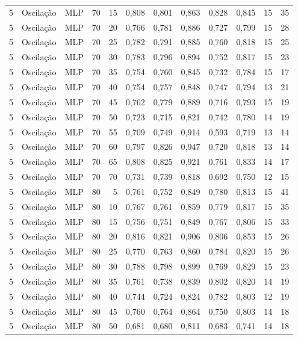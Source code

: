 \begin{longtable}{ccclrrrrrrrr}
5 & Oscilação & MLP & 70 & 15 & 0,808 & 0,801 & 0,863 & 0,828 & 0,845 & 15 & 35 \\
5 & Oscilação & MLP & 70 & 20 & 0,766 & 0,781 & 0,886 & 0,727 & 0,799 & 15 & 28 \\
5 & Oscilação & MLP & 70 & 25 & 0,782 & 0,791 & 0,885 & 0,760 & 0,818 & 15 & 25 \\
5 & Oscilação & MLP & 70 & 30 & 0,783 & 0,796 & 0,894 & 0,752 & 0,817 & 15 & 23 \\
5 & Oscilação & MLP & 70 & 35 & 0,754 & 0,760 & 0,845 & 0,732 & 0,784 & 15 & 17 \\
5 & Oscilação & MLP & 70 & 40 & 0,754 & 0,757 & 0,848 & 0,747 & 0,794 & 13 & 21 \\
5 & Oscilação & MLP & 70 & 45 & 0,762 & 0,779 & 0,889 & 0,716 & 0,793 & 15 & 19 \\
5 & Oscilação & MLP & 70 & 50 & 0,723 & 0,715 & 0,821 & 0,742 & 0,780 & 14 & 19 \\
5 & Oscilação & MLP & 70 & 55 & 0,709 & 0,749 & 0,914 & 0,593 & 0,719 & 13 & 14 \\
5 & Oscilação & MLP & 70 & 60 & 0,797 & 0,826 & 0,947 & 0,720 & 0,818 & 13 & 14 \\
5 & Oscilação & MLP & 70 & 65 & 0,808 & 0,825 & 0,921 & 0,761 & 0,833 & 14 & 17 \\
5 & Oscilação & MLP & 70 & 70 & 0,731 & 0,739 & 0,818 & 0,692 & 0,750 & 12 & 15 \\
5 & Oscilação & MLP & 80 & 5 & 0,761 & 0,752 & 0,849 & 0,780 & 0,813 & 15 & 41 \\
5 & Oscilação & MLP & 80 & 10 & 0,767 & 0,761 & 0,859 & 0,779 & 0,817 & 15 & 35 \\
5 & Oscilação & MLP & 80 & 15 & 0,756 & 0,751 & 0,849 & 0,767 & 0,806 & 15 & 33 \\
5 & Oscilação & MLP & 80 & 20 & 0,816 & 0,821 & 0,906 & 0,806 & 0,853 & 15 & 26 \\
5 & Oscilação & MLP & 80 & 25 & 0,770 & 0,763 & 0,860 & 0,784 & 0,820 & 15 & 26 \\
5 & Oscilação & MLP & 80 & 30 & 0,788 & 0,798 & 0,899 & 0,769 & 0,829 & 15 & 23 \\
5 & Oscilação & MLP & 80 & 35 & 0,761 & 0,738 & 0,839 & 0,802 & 0,820 & 14 & 19 \\
5 & Oscilação & MLP & 80 & 40 & 0,744 & 0,724 & 0,824 & 0,782 & 0,803 & 12 & 19 \\
5 & Oscilação & MLP & 80 & 45 & 0,760 & 0,764 & 0,864 & 0,750 & 0,803 & 14 & 18 \\
5 & Oscilação & MLP & 80 & 50 & 0,681 & 0,680 & 0,811 & 0,683 & 0,741 & 14 & 18 \\

\end{longtable}
